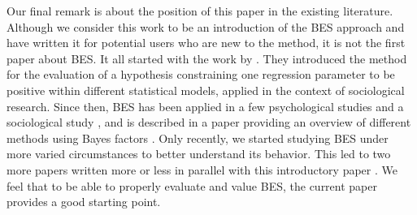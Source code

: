 \documentclass[11pt,reqno]{article}
\begin{document}
Our final remark is about the position of this paper in the existing literature. Although we consider this work to be an introduction of the BES approach and have written it for potential users who are new to the method, it is not the first paper about BES. It all started with the work by \citet{kuiper_combining_2013}. They introduced the method for the evaluation of a hypothesis constraining one regression parameter to be positive within different statistical models, applied in the context of sociological research. Since then, BES has been applied in a few psychological studies \citep{zondervan_parental_2019, zondervan_robust_2020, kevenaar_bes_2021} and a sociological study \citep{volker_cooperation_2022}, and is described in a paper providing an overview of different methods using Bayes factors \citep{heck_review_2022}. Only recently, we started studying BES under more varied circumstances to better understand its behavior. This led to two more papers written more or less in parallel with this introductory paper \citep[][both submitted for publication]{vanwonderen_bes_2022, volker_bes_2022}. We feel that to be able to properly evaluate and value BES, the current paper provides a good starting point.







\end{document}
